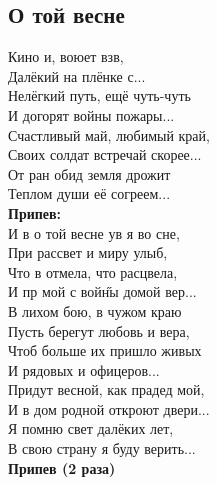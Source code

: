 \documentclass[fleqn,a5paper,12pt,twoside]{guitartabs}
\begin{document}
\subsection*{О той весне}
    Кино и, воюет взв,\\
    Далёкий  на плёнке с...\\
    Нелёгкий путь, ещё чуть-чуть\\
    И догорят войны пожары...\\
    Счастливый май, любимый край,\\
    Своих солдат  встречай скорее...\\
    От ран обид земля дрожит\\
    Теплом души её согреем...\\

    \-\hspace{10mm}\textbf{Припев:}\\
    \-\hspace{10mm}И в о той весне ув я во сне,\\
    \-\hspace{10mm}При рассвет и миру улыб,\\
    \-\hspace{10mm}Что в отмела, что  расцвела,\\
    \-\hspace{10mm}И пр мой с вой\H{ны} домой вер...\\

    В лихом бою, в чужом краю\\
    Пусть берегут любовь и вера,\\
    Чтоб больше их пришло живых\\
    И рядовых и офицеров...\\
    Придут весной, как прадед мой,\\
    И в дом родной откроют двери...\\
    Я помню свет далёких лет,\\
    В свою страну я буду верить...\\

    \-\hspace{10mm}\textbf{Припев (2 раза)}\\
\newpage
{}%
\end{document}
